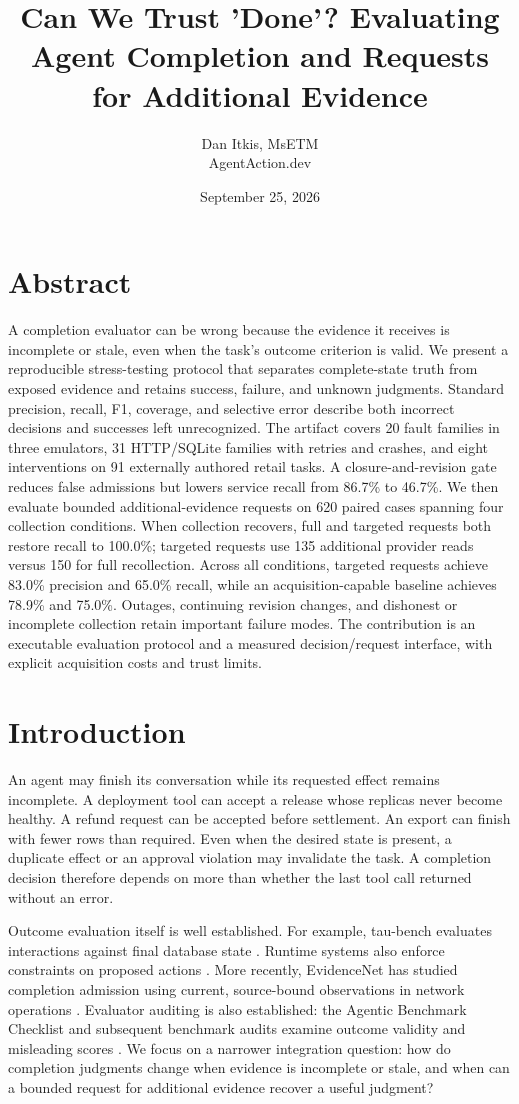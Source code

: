 \documentclass[11pt]{article}
\title{Can We Trust 'Done'? Evaluating Agent Completion and Requests for Additional Evidence}
\author{Dan Itkis, MsETM\\AgentAction.dev}
\date{September 25, 2026}
\begin{document}
\maketitle
\section*{Abstract}
A completion evaluator can be wrong because the evidence it receives is incomplete or stale, even when the task's outcome criterion is valid. We present a reproducible stress-testing protocol that separates complete-state truth from exposed evidence and retains success, failure, and unknown judgments. Standard precision, recall, F1, coverage, and selective error describe both incorrect decisions and successes left unrecognized. The artifact covers 20 fault families in three emulators, 31 HTTP/SQLite families with retries and crashes, and eight interventions on 91 externally authored retail tasks. A closure-and-revision gate reduces false admissions but lowers service recall from 86.7\% to 46.7\%. We then evaluate bounded additional-evidence requests on 620 paired cases spanning four collection conditions. When collection recovers, full and targeted requests both restore recall to 100.0\%; targeted requests use 135 additional provider reads versus 150 for full recollection. Across all conditions, targeted requests achieve 83.0\% precision and 65.0\% recall, while an acquisition-capable baseline achieves 78.9\% and 75.0\%. Outages, continuing revision changes, and dishonest or incomplete collection retain important failure modes. The contribution is an executable evaluation protocol and a measured decision/request interface, with explicit acquisition costs and trust limits.

\section{Introduction}
An agent may finish its conversation while its requested effect remains incomplete. A deployment tool can accept a release whose replicas never become healthy. A refund request can be accepted before settlement. An export can finish with fewer rows than required. Even when the desired state is present, a duplicate effect or an approval violation may invalidate the task. A completion decision therefore depends on more than whether the last tool call returned without an error.

Outcome evaluation itself is well established. For example, tau-bench evaluates interactions against final database state \cite{taubench}. Runtime systems also enforce constraints on proposed actions \cite{agentspec}. More recently, EvidenceNet has studied completion admission using current, source-bound observations in network operations \cite{evidencenet}. Evaluator auditing is also established: the Agentic Benchmark Checklist and subsequent benchmark audits examine outcome validity and misleading scores \cite{abc} \cite{benchjack} \cite{validity}. We focus on a narrower integration question: how do completion judgments change when evidence is incomplete or stale, and when can a bounded request for additional evidence recover a useful judgment?
\end{document}

